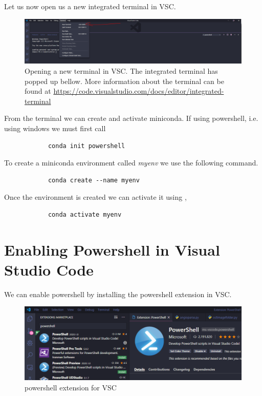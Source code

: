 \documentclass[10pt,a4paper]{article}
\begin{document}
		Let us now open us a new integrated terminal in VSC.
		\begin{figure}[h]
			\centering
			\includegraphics[scale=0.32]{figures/VSCTerminal.PNG}
			\caption{Opening a new terminal in VSC. The integrated terminal has popped up bellow. More information about the terminal can be found at \url{https://code.visualstudio.com/docs/editor/integrated-terminal}}
		\end{figure}

		From the terminal we can create and activate miniconda. If using powershell, i.e. using windows we must first call

		\begin{verbatim}
			conda init powershell
		\end{verbatim}

		To create a miniconda environment called \textit{myenv} we use the following command.

		\begin{verbatim}
			conda create --name myenv
		\end{verbatim}

		Once the environment is created we can activate it using ,
		\begin{verbatim}
			conda activate myenv
		\end{verbatim}

	\section{Enabling Powershell in Visual Studio Code}
		We can enable powershell by installing the powershell extension in VSC.
		\begin{figure}[h]
			\centering
			\includegraphics[scale=0.4]{figures/powershell_extension.PNG}
			\caption{powershell extension for VSC}
		\end{figure}
\end{document}
